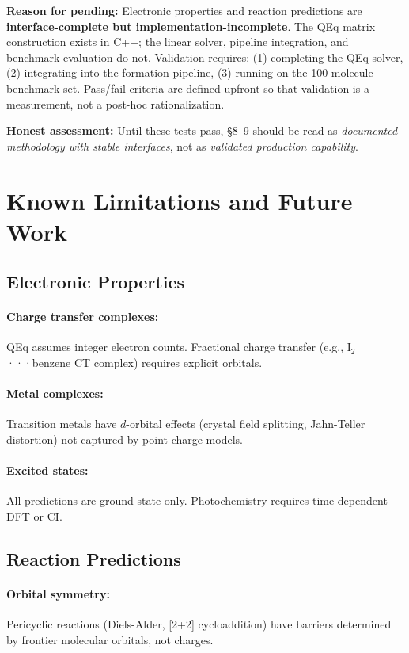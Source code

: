 \documentclass[11pt]{article}
\begin{document}
\textbf{Reason for pending:} Electronic properties and reaction predictions are \textbf{interface-complete but implementation-incomplete}. The QEq matrix construction exists in C++; the linear solver, pipeline integration, and benchmark evaluation do not. Validation requires: (1) completing the QEq solver, (2) integrating into the formation pipeline, (3) running on the 100-molecule benchmark set. Pass/fail criteria are defined upfront so that validation is a measurement, not a post-hoc rationalization.

\textbf{Honest assessment:} Until these tests pass, \S8--9 should be read as \textit{documented methodology with stable interfaces}, not as \textit{validated production capability}.

\section{Known Limitations and Future Work}

\subsection{Electronic Properties}

\paragraph{Charge transfer complexes:}
QEq assumes integer electron counts. Fractional charge transfer (e.g., I$_2$···benzene CT complex) requires explicit orbitals.

\paragraph{Metal complexes:}
Transition metals have $d$-orbital effects (crystal field splitting, Jahn-Teller distortion) not captured by point-charge models.

\paragraph{Excited states:}
All predictions are ground-state only. Photochemistry requires time-dependent DFT or CI.

\subsection{Reaction Predictions}

\paragraph{Orbital symmetry:}
Pericyclic reactions (Diels-Alder, [2+2] cycloaddition) have barriers determined by frontier molecular orbitals, not charges.
\end{document}
